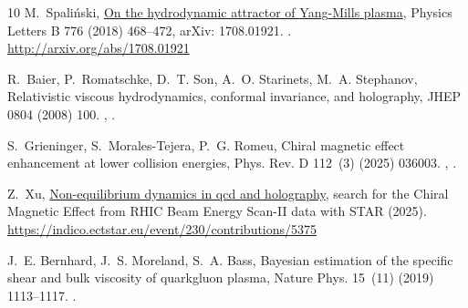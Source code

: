 \documentclass[preprint,12pt]{elsarticle}
\begin{document}
\begin{thebibliography}{10}
M.~Spaliński, \href{http://arxiv.org/abs/1708.01921}{On the hydrodynamic
  attractor of {Yang}-{Mills} plasma}, Physics Letters B 776 (2018) 468--472,
  arXiv: 1708.01921.
\newblock \href {https://doi.org/10.1016/j.physletb.2017.11.059}
  {}.
\newline\urlprefix\url{http://arxiv.org/abs/1708.01921}

R.~Baier, P.~Romatschke, D.~T. Son, A.~O. Starinets, M.~A. Stephanov,
  {Relativistic viscous hydrodynamics, conformal invariance, and holography},
  JHEP 0804 (2008) 100.
\newblock \href {http://arxiv.org/abs/0712.2451} {},
  \href {https://doi.org/10.1088/1126-6708/2008/04/100}
  {}.

S.~Grieninger, S.~Morales-Tejera, P.~G. Romeu, {Chiral magnetic effect
  enhancement at lower collision energies}, Phys. Rev. D 112~(3) (2025) 036003.
\newblock \href {http://arxiv.org/abs/2503.10593} {},
  \href {https://doi.org/10.1103/xgkt-1qsb} {}.

Z.~Xu,
  \href{https://indico.ectstar.eu/event/230/contributions/5375}{Non-equilibrium
  dynamics in qcd and holography}, search for the Chiral Magnetic Effect from
  RHIC Beam Energy Scan-II data with STAR (2025).
\newline\urlprefix\url{https://indico.ectstar.eu/event/230/contributions/5375}

J.~E. Bernhard, J.~S. Moreland, S.~A. Bass, {Bayesian estimation of the
  specific shear and bulk viscosity of quark{\textendash}gluon plasma}, Nature
  Phys. 15~(11) (2019) 1113--1117.
\newblock \href {https://doi.org/10.1038/s41567-019-0611-8}
  {}.

\end{thebibliography}








\end{document}
